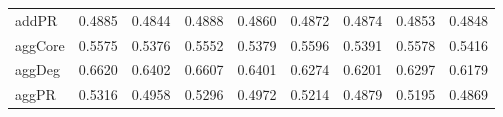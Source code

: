 \begin{table}[!htbp]
\begin{tabular}{lrrrrrrrr}
               addPR &     {\num{ 0.4885}} &     {\num{ 0.4844}} &     {\num{ 0.4888}} &     {\num{ 0.4860}} &     {\num{ 0.4872}} &     {\num{ 0.4874}} &     {\num{ 0.4853}} &     {\num{ 0.4848}} \\
             aggCore &     {\num{ 0.5575}} &     {\num{ 0.5376}} &     {\num{ 0.5552}} &     {\num{ 0.5379}} &     {\num{ 0.5596}} &     {\num{ 0.5391}} &     {\num{ 0.5578}} &     {\num{ 0.5416}} \\
              aggDeg &     {\num{ 0.6620}} &     {\num{ 0.6402}} &     {\num{ 0.6607}} &     {\num{ 0.6401}} &     {\num{ 0.6274}} &     {\num{ 0.6201}} &     {\num{ 0.6297}} &     {\num{ 0.6179}} \\
               aggPR &     {\num{ 0.5316}} &     {\num{ 0.4958}} &     {\num{ 0.5296}} &     {\num{ 0.4972}} &     {\num{ 0.5214}} &     {\num{ 0.4879}} &     {\num{ 0.5195}} &     {\num{ 0.4869}} \\

\end{tabular}
\end{table}
